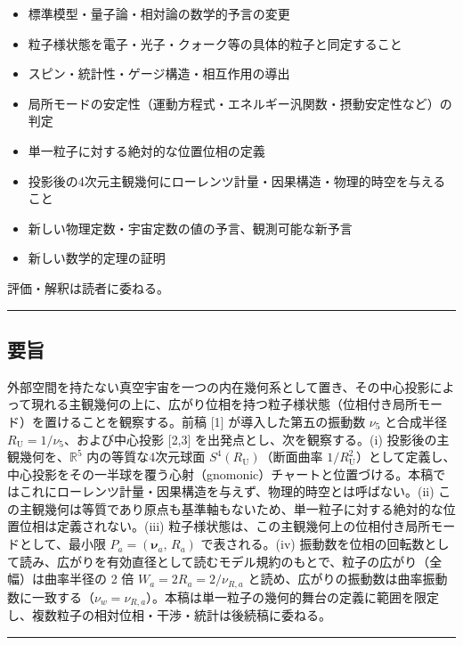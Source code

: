 \documentclass[
]{ltjsarticle}
\providecommand{\tightlist}{%
  \setlength{\itemsep}{0pt}\setlength{\parskip}{0pt}}
\begin{document}
\begin{itemize}
\tightlist
\item
  標準模型・量子論・相対論の数学的予言の変更
\item
  粒子様状態を電子・光子・クォーク等の具体的粒子と同定すること
\item
  スピン・統計性・ゲージ構造・相互作用の導出
\item
  局所モードの安定性（運動方程式・エネルギー汎関数・摂動安定性など）の判定
\item
  単一粒子に対する絶対的な位置位相の定義
\item
  投影後の4次元主観幾何にローレンツ計量・因果構造・物理的時空を与えること
\item
  新しい物理定数・宇宙定数の値の予言、観測可能な新予言
\item
  新しい数学的定理の証明
\end{itemize}

評価・解釈は読者に委ねる。

\begin{center}\rule{0.5\linewidth}{0.5pt}\end{center}

\subsection{要旨}\label{ux8981ux65e8}

外部空間を持たない真空宇宙を一つの内在幾何系として置き、その中心投影によって現れる主観幾何の上に、広がり位相を持つ粒子様状態（位相付き局所モード）を置けることを観察する。前稿
{[}1{]} が導入した第五の振動数 \(\nu_5\) と合成半径
\(R_{\mathrm U}=1/\nu_5\)、および中心投影 {[}2,3{]}
を出発点とし、次を観察する。(i) 投影後の主観幾何を、\(\mathbb{R}^5\)
内の等質な4次元球面 \(S^4(R_{\mathrm U})\)（断面曲率
\(1/R_{\mathrm U}^2\)）として定義し、中心投影をその一半球を覆う心射（gnomonic）チャートと位置づける。本稿ではこれにローレンツ計量・因果構造を与えず、物理的時空とは呼ばない。(ii)
この主観幾何は等質であり原点も基準軸もないため、単一粒子に対する絶対的な位置位相は定義されない。(iii)
粒子様状態は、この主観幾何上の位相付き局所モードとして、最小限
\(P_a=(\boldsymbol{\nu}_a,\,R_a)\) で表される。(iv)
振動数を位相の回転数として読み、広がりを有効直径として読むモデル規約のもとで、粒子の広がり（全幅）は曲率半径の
2 倍 \(W_a=2R_a=2/\nu_{R,a}\)
と読め、広がりの振動数は曲率振動数に一致する（\(\nu_w=\nu_{R,a}\)）。本稿は単一粒子の幾何的舞台の定義に範囲を限定し、複数粒子の相対位相・干渉・統計は後続稿に委ねる。

\begin{center}\rule{0.5\linewidth}{0.5pt}\end{center}
\end{document}
